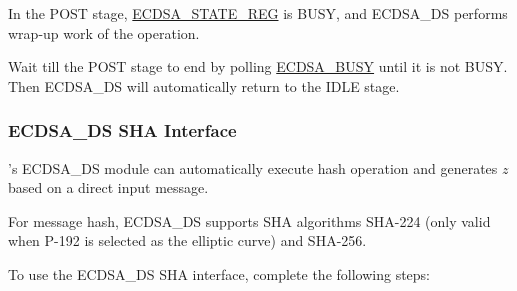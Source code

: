 \documentclass[main\_\_EN.tex]{subfiles}
\begin{document}
In the POST stage, \hyperref[regdesc:ECDSASTATEREG]{ECDSA\_STATE\_REG} is BUSY, and ECDSA\_DS performs wrap-up work of the operation.

Wait till the POST stage to end by polling \hyperref[fielddesc:ECDSABUSY]{ECDSA\_BUSY} until it is not BUSY. Then ECDSA\_DS will automatically return to the IDLE stage.

\subsubsection{ECDSA\_DS SHA Interface}
\label{sec:ecdsa-sha-interface}

\chipseries{}'s ECDSA\_DS module can automatically execute hash operation and generates $z$ based on a direct input message.

For message hash, ECDSA\_DS supports SHA algorithms SHA-224 (only valid when P-192 is selected as the elliptic curve) and SHA-256.

To use the ECDSA\_DS SHA interface, complete the following steps:
\end{document}
